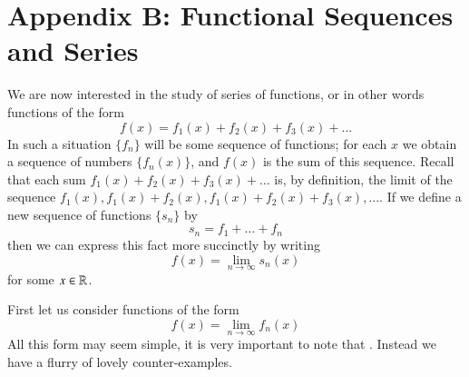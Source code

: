 %
\section*{Appendix B: Functional Sequences and Series}
%
We are now interested in the study of series of functions, or in other words functions of the form \begin{equation*}
    f(x) = f_1(x) + f_2(x) + f_3(x) + \hdots
\end{equation*}
In such a situation $\{f_n\}$ will be some sequence of functions; for each $x$ we obtain a sequence of numbers $\{f_n(x)\}$, and $f(x)$ is the sum of this sequence. Recall that each sum $f_1(x)+f_2(x)+f_3(x) + \hdots$ is, by definition, the limit of the sequence $f_1(x),f_1(x)+f_2(x),f_1(x)+f_2(x)+f_3(x),...$. If we define a new sequence of functions $\{s_n\}$ by \begin{equation*}
    s_n = f_1 + \hdots + f_n
\end{equation*}
then we can express this fact more succinctly by writing \begin{equation*}
    f(x) = \lim\limits_{n\rightarrow \infty}s_n(x)
\end{equation*}
for some $x \in \mathbb R$.

First let us consider functions of the form \begin{equation*}
    f(x) = \lim\limits_{n\rightarrow\infty}f_n(x)
\end{equation*}
All this form may seem simple, it is very important to note that . Instead we have a flurry of lovely counter-examples.


